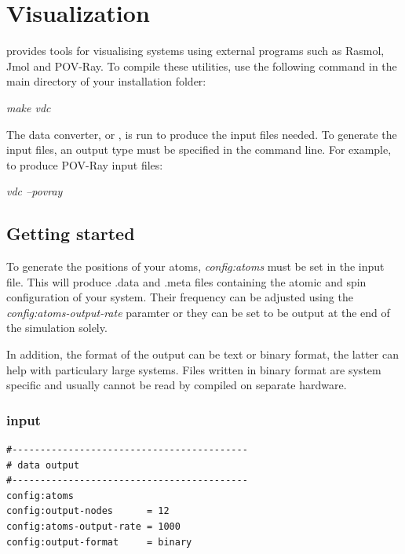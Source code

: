 \chapter{Visualization}\label{chap:visualization}

\vampire provides tools for visualising systems using external programs such as Rasmol, Jmol and POV-Ray. To compile these utilities, use the following command in the main directory of your \vampire installation folder:

\noindent
\begin{minipage}[c]{\textwidth}
\centering
\textit{make vdc}
\end{minipage}

The \vampire data converter, or \vdc, is run to produce the input files needed. To generate the input files, an output type must be specified in the command line. For example, to produce POV-Ray input files:

\noindent
\begin{minipage}[c]{\textwidth}
\centering
\textit{vdc --povray}
\end{minipage}


\section*{Getting started}

To generate the positions of your atoms, \textit{config:atoms} must be set in the input file. This will produce .data and .meta files containing the atomic and spin configuration of your system. Their frequency can be adjusted using the \textit{config:atoms-output-rate} paramter or they can be set to be output at the end of the simulation solely.

In addition, the format of the output can be text or binary format, the latter can help with particulary large systems. Files written in binary format are system specific and usually cannot be read by \vdc compiled on separate hardware.

\subsection*{input}
{\footnotesize
\begin{verbatim}
#------------------------------------------
# data output
#------------------------------------------
config:atoms
config:output-nodes      = 12
config:atoms-output-rate = 1000
config:output-format     = binary
\end{verbatim}
}

